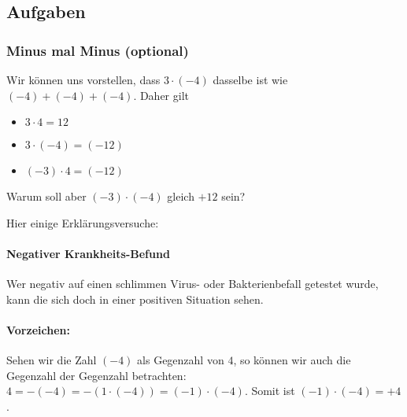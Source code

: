 \subsection*{Aufgaben}
\newpage


\subsubsection{Minus mal Minus (optional)}
Wir können uns vorstellen, dass $3 \cdot (-4)$ dasselbe ist wie $(-4) + (-4) + (-4)$. Daher gilt
\begin{itemize}
\item $3 \cdot 4 = 12$
\item $3 \cdot (-4) = (-12)$
\item $(-3) \cdot 4 = (-12)$
\end{itemize}
Warum soll aber $(-3)\cdot(-4)$ gleich $+12$ sein?

Hier einige Erklärungsversuche:


\paragraph{Negativer Krankheits-Befund}
Wer negativ auf einen schlimmen Virus- oder Bakterienbefall getestet wurde, kann
die sich doch in einer positiven Situation sehen.

\paragraph{Vorzeichen:} Sehen wir die Zahl $(-4)$ als Gegenzahl von $4$, so können wir auch die Gegenzahl der Gegenzahl betrachten:
$4 = -(-4) = -(1\cdot(-4)) = (-1)\cdot(-4)$. Somit ist $(-1)\cdot(-4) = +4$.

